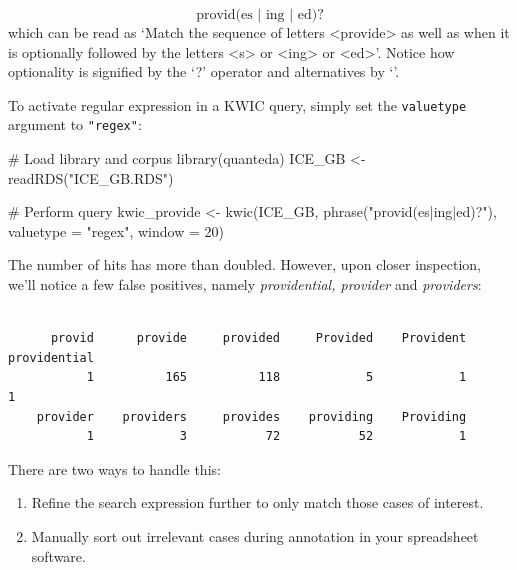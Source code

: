 \documentclass[
  11pt,
  letterpaper,
  DIV=11,
  numbers=noendperiod]{scrreprt}
\newenvironment{Shaded}{\begin{snugshade}}{\end{snugshade}}
\newcommand{\AttributeTok}[1]{\textcolor[rgb]{0.40,0.45,0.13}{#1}}
\newcommand{\CommentTok}[1]{\textcolor[rgb]{0.37,0.37,0.37}{#1}}
\newcommand{\DecValTok}[1]{\textcolor[rgb]{0.68,0.00,0.00}{#1}}
\newcommand{\FunctionTok}[1]{\textcolor[rgb]{0.28,0.35,0.67}{#1}}
\newcommand{\NormalTok}[1]{\textcolor[rgb]{0.00,0.23,0.31}{#1}}
\newcommand{\OtherTok}[1]{\textcolor[rgb]{0.00,0.23,0.31}{#1}}
\newcommand{\SpecialCharTok}[1]{\textcolor[rgb]{0.37,0.37,0.37}{#1}}
\newcommand{\StringTok}[1]{\textcolor[rgb]{0.13,0.47,0.30}{#1}}
\providecommand{\tightlist}{%
  \setlength{\itemsep}{0pt}\setlength{\parskip}{0pt}}\usepackage{longtable,booktabs,array}
\begin{document}
\[
\text{provid(es | ing | ed)?}
\]which can be read as `Match the sequence of letters
\textless provide\textgreater{} as well as when it is optionally
followed by the letters \textless s\textgreater{} or
\textless ing\textgreater{} or \textless ed\textgreater{}'. Notice how
optionality is signified by the `?' operator and alternatives by
`\textbar{}'.

To activate regular expression in a KWIC query, simply set the
\texttt{valuetype} argument to \texttt{"regex"}:

\begin{Shaded}
\begin{Highlighting}[]
\CommentTok{\# Load library and corpus}
\FunctionTok{library}\NormalTok{(quanteda)}
\NormalTok{ICE\_GB }\OtherTok{\textless{}{-}} \FunctionTok{readRDS}\NormalTok{(}\StringTok{"ICE\_GB.RDS"}\NormalTok{)}

\CommentTok{\# Perform query}
\NormalTok{kwic\_provide }\OtherTok{\textless{}{-}} \FunctionTok{kwic}\NormalTok{(ICE\_GB,}
                     \FunctionTok{phrase}\NormalTok{(}\StringTok{"provid(es|ing|ed)?"}\NormalTok{),}
                     \AttributeTok{valuetype =} \StringTok{"regex"}\NormalTok{,}
                     \AttributeTok{window =} \DecValTok{20}\NormalTok{)}
\end{Highlighting}
\end{Shaded}

The number of hits has more than doubled. However, upon closer
inspection, we'll notice a few false positives, namely
\emph{providential, provider} and \emph{providers}:

\begin{Shaded}
\end{Shaded}

\begin{verbatim}

      provid      provide     provided     Provided    Provident providential 
           1          165          118            5            1            1 
    provider    providers     provides    providing    Providing 
           1            3           72           52            1 
\end{verbatim}

There are two ways to handle this:

\begin{enumerate}
\def\labelenumi{\arabic{enumi}.}
\tightlist
\item
  Refine the search expression further to only match those cases of
  interest.
\item
  Manually sort out irrelevant cases during annotation in your
  spreadsheet software.
\end{enumerate}
\end{document}
